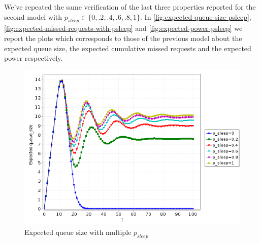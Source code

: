 We've repeated the same verification of the last three properties
reported for the second model with $p_{sleep} \in \{0, .2, .4, .6, .8,
1\}$. In \autoref{fig:expected-queue-size-psleep},
\autoref{fig:expected-missed-requests-with-psleep} and
\autoref{fig:expected-power-psleep} we report the plots which
corresponds to those of the previous model about the expected queue
size, the expected cumulative missed requests and the expected power
respectively.
\begin{figure}[htb]
  \centering
  \includegraphics[width=13cm]{quantitative-project/expected-queue-size-with-psleep.png}
  \caption{Expected queue size with multiple $p_{sleep}$}
  \label{fig:expected-queue-size-psleep}
\end{figure}

